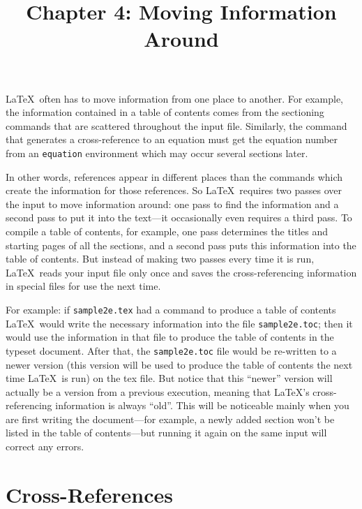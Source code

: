 \documentclass{article}
\title{Chapter 4: Moving Information Around} %
\author{}
\date{}
\begin{document}
\maketitle %

\LaTeX\ often has to move information from one place to another. For example, the information
contained in a table of contents comes from the sectioning commands that are scattered throughout
the input file. Similarly, the command that generates a cross-reference to an equation must get the
equation number from an {\tt equation} environment which may occur several sections later. 

In other words, references appear in different places than the commands which create the information
for those references. So \LaTeX\ requires two passes over the input to move information around: one
pass to find the information and a second pass to put it into the text—it occasionally even
requires a third pass. To compile a table of contents, for example, one pass determines the titles
and starting pages of all the sections, and a second pass puts this information into the table of
contents. But instead of making two passes every time it is run, \LaTeX\ reads your input file only
once and saves the cross-referencing information in special files for use the next time. 

For example: if {\tt sample2e.tex} had a command to produce a table of contents \LaTeX\ would write
the necessary information into the file {\tt sample2e.toc}; then it would use the information in
that file to produce the table of contents in the typeset document. After that, the
{\tt sample2e.toc} file would be re-written to a newer version (this version will be used to
produce the table of contents the next time \LaTeX\ is run) on the tex file. But notice that this
``newer'' version will actually be a version from a previous execution, meaning that \LaTeX's
cross-referencing information is always ``old''. This will be noticeable mainly when you are first
writing the document—for example, a newly added section won't be listed in the table of
contents—but running it again on the same input will correct any errors.


\section{Cross-References}
\end{document}
